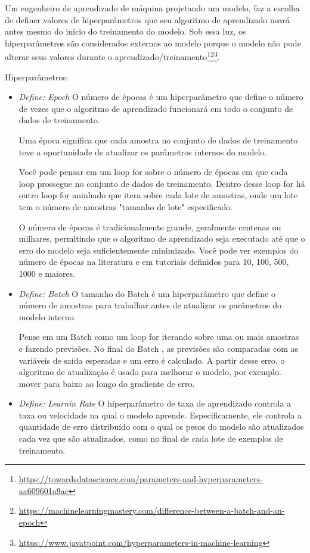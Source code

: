 Um engenheiro de aprendizado de máquina projetando um modelo, faz a escolha de definer valores de hiperparâmetros que seu algoritmo de aprendizado usará antes mesmo do início do treinamento do modelo. Sob essa luz, os hiperparâmetros são considerados externos ao modelo porque o modelo não pode alterar seus valores durante o aprendizado/treinamento\footnote{\url{https://towardsdatascience.com/parameters-and-hyperparameters-aa609601a9ac}}\footnote{\url{https://machinelearningmastery.com/difference-between-a-batch-and-an-epoch}}\footnote{\url{https://www.javatpoint.com/hyperparameters-in-machine-learning}}.


Hiperparâmetros:


\begin{itemize}
   \item  \textit{Define: Epoch} O número de épocas é um hiperparâmetro que define o número de vezes que o algoritmo de aprendizado funcionará em todo o conjunto de dados de treinamento.

         Uma época significa que cada amostra no conjunto de dados de treinamento teve a oportunidade de atualizar os parâmetros internos do modelo.

         Você pode pensar em um loop for sobre o número de épocas em que cada loop prossegue no conjunto de dados de treinamento. Dentro desse loop for há outro loop for aninhado que itera sobre cada lote de amostras, onde um lote tem o número de amostras "tamanho de lote" especificado.

         O número de épocas é tradicionalmente grande, geralmente centenas ou milhares, permitindo que o algoritmo de aprendizado seja executado até que o erro do modelo seja suficientemente minimizado. Você pode ver exemplos do número de épocas na literatura e em tutoriais definidos para 10, 100, 500, 1000 e maiores.

   \item \textit{Define: Batch} O tamanho do Batch é um hiperparâmetro que define o número de amostras para trabalhar antes de atualizar os parâmetros do modelo interno.

         Pense em um Batch como um loop for iterando sobre uma ou mais amostras e fazendo previsões. No final do Batch , as previsões são comparadas com as variáveis de saída esperadas e um erro é calculado. A partir desse erro, o algoritmo de atualização é usado para melhorar o modelo, por exemplo. mover para baixo ao longo do gradiente de erro.

   \item \textit{Define: Learnin Rate} O hiperparâmetro de taxa de aprendizado controla a taxa ou velocidade na qual o modelo aprende. Especificamente, ele controla a quantidade de erro distribuído com o qual os pesos do modelo são atualizados cada vez que são atualizados, como no final de cada lote de exemplos de treinamento.


\end{itemize}
